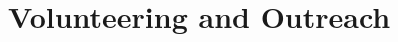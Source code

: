 \documentclass[11pt, a4paper]{article}
\newcommand{\Duration}[2]{\fontsize{10pt}{0}\selectfont #1--#2}
\newcommand{\Year}[1]{\fontsize{10pt}{0}\selectfont #1}
\begin{document}



% 


%

\section*{Volunteering and Outreach}
\end{document}
